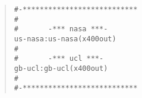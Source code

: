 \begin{quote}\small\begin{verbatim}
#-***************************
#
#       -*** nasa ***-
us-nasa:us-nasa(x400out)
#
#       -*** ucl ***-
gb-ucl:gb-ucl(x400out)
#
#-***************************
\end{verbatim}\end{quote}
